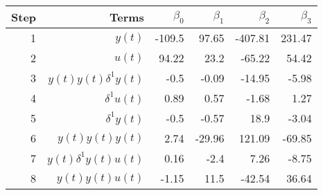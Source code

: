 \begin{tabular}{rrrrrr}
Step & Terms & $\beta_{0}$ & $\beta_{1}$ & $\beta_{2}$ & $\beta_{3}$ \\ 
\hline 
1 & $y(t)$ & -109.5 & 97.65 & -407.81 & 231.47 \\ 
2 & $u(t)$ & 94.22 & 23.2 & -65.22 & 54.42 \\ 
3 & $y(t)y(t)\delta^1 y(t)$ & -0.5 & -0.09 & -14.95 & -5.98 \\ 
4 & $\delta^1 u(t)$ & 0.89 & 0.57 & -1.68 & 1.27 \\ 
5 & $\delta^1 y(t)$ & -0.5 & -0.57 & 18.9 & -3.04 \\ 
6 & $y(t)y(t)y(t)$ & 2.74 & -29.96 & 121.09 & -69.85 \\ 
7 & $y(t)\delta^1 y(t)u(t)$ & 0.16 & -2.4 & 7.26 & -8.75 \\ 
8 & $y(t)y(t)u(t)$ & -1.15 & 11.5 & -42.54 & 36.64 \\ 
\hline 
\end{tabular}